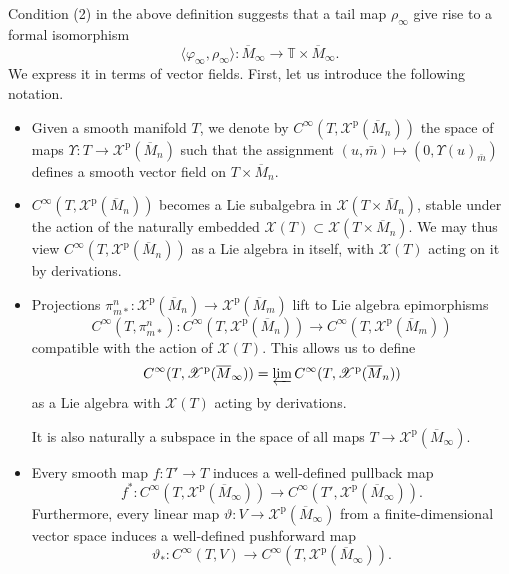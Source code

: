 \documentclass{article}
\def\TT{\mathbb{T}}
\def\XX{\mathscr{X}}
\def\p{\mathrm{p}}
\theoremstyle{definition}
\begin{document}
Condition (2) in the above definition suggests that
a tail map $\rho_\infty$ give rise to a formal isomorphism
$$\langle \varphi_\infty,\rho_\infty\rangle : \overline M_\infty \to \TT\times\overline M_\infty.$$
We express it in terms of vector fields. First,
let us introduce the following notation.
\begin{itemize}
\item
Given a smooth manifold $T$,
we denote by $C^\infty(T, \XX^\p(\overline M_n))$
the space of maps $\Upsilon : T \to \XX^\p(\overline M_n)$
such that
the assignment $(u, \bar m) \mapsto (0, \Upsilon(u)_{\bar m})$
defines a smooth vector field on $T \times \overline M_n$.
\item   $C^\infty(T, \XX^\p(\overline M_n))$ becomes a Lie subalgebra in $\XX(T\times\overline M_n)$,
        stable under the action of the naturally embedded $\XX(T) \subset \XX(T\times\overline M_n)$. 
        We may thus view $C^\infty(T, \XX^\p(\overline M_n))$
        as a Lie algebra in itself, with $\XX(T)$ acting on it by derivations. 
\item   Projections $\pi^n_{m*} : \XX^\p(\overline M_n) \to \XX^\p(\overline M_m)$ lift to Lie algebra epimorphisms $$C^\infty(T,\pi^n_{m*}) : C^\infty(T,\XX^\p(\overline M_n))
        \to C^\infty(T, \XX^\p(\overline M_m))$$ compatible with
        the action of $\XX(T)$.
        This allows us to define $$C^\infty(T, \XX^\p(\overline M_\infty)) 
        = \varprojlim C^\infty(T,\XX^\p(\overline M_n))$$
        as a Lie algebra with $\XX(T)$ acting by derivations. 
        
        It is also naturally a subspace
        in the space of all maps $T \to\XX^\p( \overline M_\infty )$.
\item Every smooth map $f:T' \to T$
        induces a well-defined pullback map
        $$f^*:C^\infty(T, \XX^\p(\overline M_\infty)) \to
        C^\infty(T', \XX^\p(\overline M_\infty)).$$
        Furthermore, every linear map
$\vartheta: V\to \XX^\p(\overline M_\infty)$ 
from a finite-dimensional vector space 
induces a well-defined pushforward map $$\vartheta_*:C^\infty(T,V) \to C^\infty(T,\XX^\p(\overline M_\infty)).$$
\end{itemize}
\end{document}

